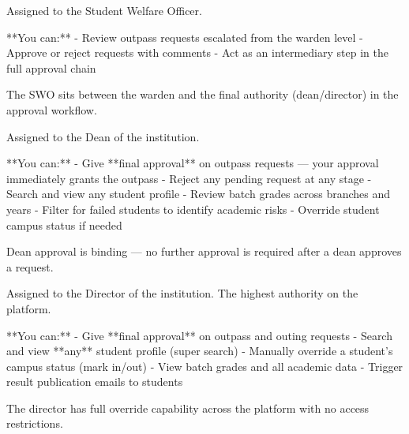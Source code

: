\begin{tcolorbox}[colback=gray!5,colframe=primary,title=Documentation Note]
\begin{tcolorbox}[colback=gray!5,colframe=primary,title=Documentation Note]
  
\end{tcolorbox}


  
\begin{tcolorbox}[colback=gray!5,colframe=primary,title=Documentation Note]

    Assigned to the Student Welfare Officer.

    **You can:**
    - Review outpass requests escalated from the warden level
    - Approve or reject requests with comments
    - Act as an intermediary step in the full approval chain

    The SWO sits between the warden and the final authority (dean/director) in the approval workflow.

  
\end{tcolorbox}


  
\begin{tcolorbox}[colback=gray!5,colframe=primary,title=Documentation Note]

    Assigned to the Dean of the institution.

    **You can:**
    - Give **final approval** on outpass requests — your approval immediately grants the outpass
    - Reject any pending request at any stage
    - Search and view any student profile
    - Review batch grades across branches and years
    - Filter for failed students to identify academic risks
    - Override student campus status if needed

    Dean approval is binding — no further approval is required after a dean approves a request.

  
\end{tcolorbox}


  
\begin{tcolorbox}[colback=gray!5,colframe=primary,title=Documentation Note]

    Assigned to the Director of the institution. The highest authority on the platform.

    **You can:**
    - Give **final approval** on outpass and outing requests
    - Search and view **any** student profile (super search)
    - Manually override a student's campus status (mark in/out)
    - View batch grades and all academic data
    - Trigger result publication emails to students

    The director has full override capability across the platform with no access restrictions.

  
\end{tcolorbox}



\end{tcolorbox}
